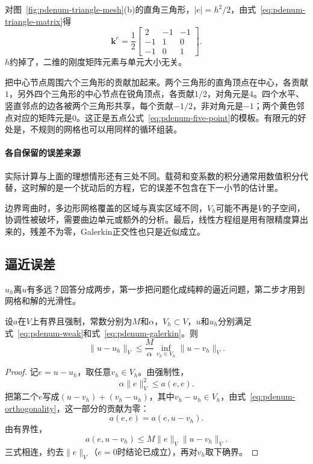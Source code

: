 对图~\ref{fig:pdenum-triangle-mesh}(b)的直角三角形，$\lvert e\rvert=h^2/2$，由式~\eqref{eq:pdenum-triangle-matrix}得
\[
 \bm{k}^{e}=\frac12\begin{bmatrix}2&-1&-1\\-1&1&0\\-1&0&1\end{bmatrix}.
\]
$h$约掉了，二维的刚度矩阵元素与单元大小无关。

把中心节点周围六个三角形的贡献加起来。两个三角形的直角顶点在中心，各贡献$1$，另外四个三角形的中心节点在锐角顶点，各贡献$1/2$，对角元是$4$。四个水平、竖直邻点的边各被两个三角形共享，每个贡献$-1/2$，非对角元是$-1$；两个黄色邻点对应的矩阵元是$0$。这正是五点公式~\eqref{eq:pdenum-five-point}的模板。有限元的好处是，不规则的网格也可以用同样的循环组装。

\paragraph{各自保留的误差来源}
实际计算与上面的理想情形还有三处不同。载荷和变系数的积分通常用数值积分代替，这时解的是一个扰动后的方程，它的误差不包含在下一小节的估计里。

边界弯曲时，多边形网格覆盖的区域与真实区域不同，$V_h$可能不再是$V$的子空间，协调性被破坏，需要曲边单元或额外的分析。最后，线性方程组是用有限精度算出来的，残差不为零，Galerkin正交性也只是近似成立。

\subsection{逼近误差}
\label{sec:pdenum-fem-error}

$u_h$离$u$有多远？回答分成两步，第一步把问题化成纯粹的逼近问题，第二步才用到网格和解的光滑性。

\begin{theorem}[Céa估计]
 \label{thm:pdenum-cea}
 设$a$在$V$上有界且强制，常数分别为$M$和$\alpha$，$V_h\subset V$，$u$和$u_h$分别满足式~\eqref{eq:pdenum-weak}和式~\eqref{eq:pdenum-galerkin}。则
 \begin{equation}
  \lVert u-u_h\rVert_V\leq\frac{M}{\alpha}\inf_{v_h\in V_h}\lVert u-v_h\rVert_V .
  \label{eq:pdenum-cea}
 \end{equation}
\end{theorem}

\begin{proof}
 记$e=u-u_h$，取任意$v_h\in V_h$。由强制性，
 \[
  \alpha\lVert e\rVert_V^2\leq a(e,e) .
 \]
 把第二个$e$写成$(u-v_h)+(v_h-u_h)$，其中$v_h-u_h\in V_h$，由式~\eqref{eq:pdenum-orthogonality}，这一部分的贡献为零：
 \[
  a(e,e)=a(e,u-v_h) .
 \]
 由有界性，
 \[
  a(e,u-v_h)\leq M\lVert e\rVert_V\lVert u-v_h\rVert_V .
 \]
 三式相连，约去$\lVert e\rVert_V$（$e=0$时结论已成立），再对$v_h$取下确界。
\end{proof}

